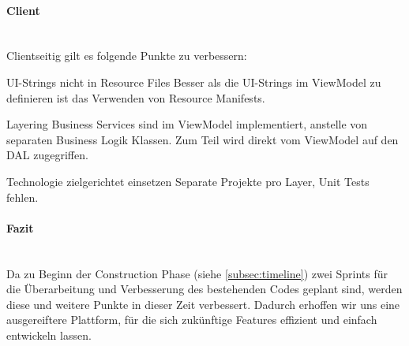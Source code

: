 \paragraph{Client}~\\
Clientseitig gilt es folgende Punkte zu verbessern:
\begin{basedescript}{
	\desclabelstyle{\multilinelabel}
	\desclabelwidth{4.5cm}
	\setlength{\itemsep}{5ex}}
\item[UI-Strings nicht in Resource Files] Besser als die UI-Strings im ViewModel zu definieren ist das Verwenden von Resource Manifests.
\item[Layering] Business Services sind im ViewModel implementiert, anstelle von separaten Business Logik Klassen. Zum Teil wird direkt vom ViewModel auf den DAL zugegriffen.
\item[Technologie zielgerichtet einsetzen] Separate Projekte pro Layer, Unit Tests fehlen.
\end{basedescript}
\vspace{0.5cm}
\paragraph{Fazit}~\\
Da zu Beginn der Construction Phase (siehe \ref{subsec:timeline}) zwei Sprints für die Überarbeitung und Verbesserung des bestehenden Codes geplant sind, werden diese und weitere Punkte in dieser Zeit verbessert. Dadurch erhoffen wir uns eine ausgereiftere Plattform, für die sich zukünftige Features effizient und einfach entwickeln lassen. 